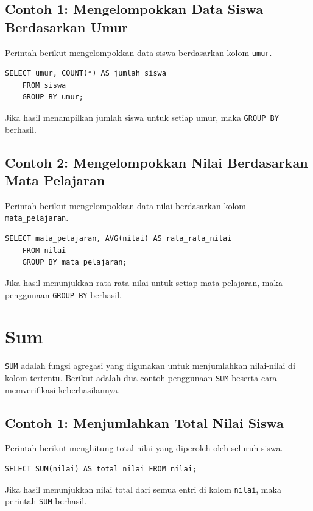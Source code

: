 \subsection*{Contoh 1: Mengelompokkan Data Siswa Berdasarkan Umur}
Perintah berikut mengelompokkan data siswa berdasarkan kolom \texttt{umur}.

\begin{lstlisting}[style=sql]
	SELECT umur, COUNT(*) AS jumlah_siswa
	FROM siswa
	GROUP BY umur;
\end{lstlisting}

Jika hasil menampilkan jumlah siswa untuk setiap umur, maka \texttt{GROUP BY} berhasil.

\subsection*{Contoh 2: Mengelompokkan Nilai Berdasarkan Mata Pelajaran}
Perintah berikut mengelompokkan data nilai berdasarkan kolom \texttt{mata\_pelajaran}.

\begin{lstlisting}[style=sql]
	SELECT mata_pelajaran, AVG(nilai) AS rata_rata_nilai
	FROM nilai
	GROUP BY mata_pelajaran;
\end{lstlisting}

Jika hasil menunjukkan rata-rata nilai untuk setiap mata pelajaran, maka penggunaan \texttt{GROUP BY} berhasil.

\section{Sum}

\texttt{SUM} adalah fungsi agregasi yang digunakan untuk menjumlahkan nilai-nilai di kolom tertentu. Berikut adalah dua contoh penggunaan \texttt{SUM} beserta cara memverifikasi keberhasilannya.

\subsection*{Contoh 1: Menjumlahkan Total Nilai Siswa}
Perintah berikut menghitung total nilai yang diperoleh oleh seluruh siswa.

\begin{lstlisting}[style=sql]
	SELECT SUM(nilai) AS total_nilai FROM nilai;
\end{lstlisting}

Jika hasil menunjukkan nilai total dari semua entri di kolom \texttt{nilai}, maka perintah \texttt{SUM} berhasil.


